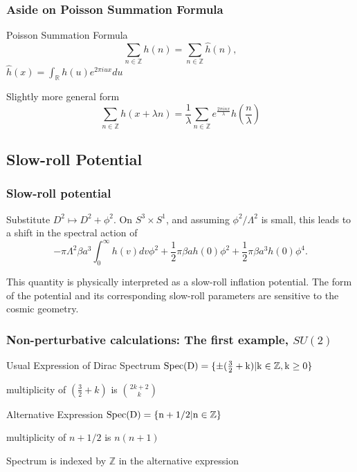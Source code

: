 \documentclass{beamer}
\def\Z{{\mathbb Z}}
\def\R{{\mathbb R}}
\begin{document}
\begin{frame}
	\frametitle{Aside on Poisson Summation Formula}
	\begin{block}{Poisson Summation Formula}
		\[
			\sum_{n \in \Z} h(n) = \sum_{n\in \Z} \widehat{h}(n),
		\]
		$\widehat{h}(x) = \int_{\R} h(u) e^{2\pi i u x} du$
	\end{block}
	
	\pause
	
	\begin{block}{Slightly more general form}
		\[
		\sum_{n \in \Z} h(x + \lambda n) = \frac{1}{\lambda} \sum_{n \in \Z} e^{\frac{2\pi i n x}{\lambda}}\widehat{h}(\frac{n}{\lambda})
		\]
	\end{block}
\end{frame}

\subsection{Slow-roll Potential}
\begin{frame}
	\frametitle{Slow-roll potential}
	\begin{block}{}
		Substitute $D^2 \mapsto D^2 + \phi^2$. On $S^3 \times S^1$, and assuming $\phi^2 / \Lambda^2$ is small, this leads to a shift in the spectral action of
		\[
		-\pi \Lambda ^2 \beta a^3 \int_0^{\infty} h(v)dv \phi ^2 + \frac{1}{2} \pi \beta a h(0) \phi^2 + \frac{1}{2} \pi \beta a^3 h(0) \phi^4.
		\]
	\end{block}
	
	\begin{block}{}
		This quantity is physically interpreted as a slow-roll inflation potential.  The form of the potential and its corresponding slow-roll parameters are sensitive to the cosmic geometry.
	\end{block}
\end{frame}

\begin{frame}
  \frametitle{Non-perturbative calculations: The first example, $SU(2)$}
  \begin{block}{Usual Expression of Dirac Spectrum}
    $\rm{Spec}(D) = \{ \pm (\frac{3}{2} + k) | k \in \Z, k \geq 0\}$

    multiplicity of $(\frac{3}{2} + k)$ is $2 {k+2} \choose {k}$
  \end{block}

  \pause

  \begin{block}{Alternative Expression}
    $\rm{Spec}(D) = \{n + 1/2 | n \in \Z \}$

    multiplicity of $n + 1/2$ is $n(n+1)$
  \end{block}

  \begin{block}{}
   Spectrum is indexed by $\Z$ in the alternative expression
  \end{block}
\end{frame}
\end{document}
